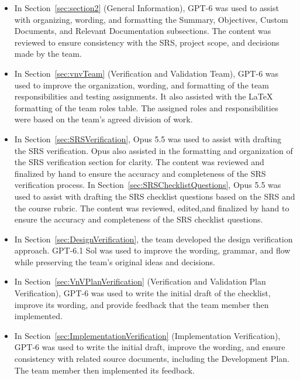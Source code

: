 \documentclass[10pt,titlepage]{article}
\begin{document}
\begin{itemize}
  \item In Section~\ref{sec:section2} (General Information), GPT-6 was used to assist
  with organizing, wording, and formatting the Summary, Objectives,
  Custom Documents, and Relevant Documentation subsections.
  The content was reviewed to ensure consistency with the SRS,
  project scope, and decisions made by the team.

  \item In Section~\ref{sec:vnvTeam} (Verification and Validation Team), GPT-6
  was used to improve the organization, wording, and formatting
  of the team responsibilities and testing assignments. It also
  assisted with the LaTeX formatting of the team roles table.
  The assigned roles and responsibilities were based on the
  team's agreed division of work.

  \item In Section~\ref{sec:SRSVerification}, Opus 5.5 was used to assist with 
  drafting the SRS verification. Opus also assisted in the formatting and 
  organization of the SRS verification section for clarity. The content was reviewed 
  and finalized by hand to ensure the accuracy and completeness of the SRS 
  verification process. In Section~\ref{sec:SRSChecklistQuestions}, Opus 5.5 
  was used to assist with drafting the SRS checklist questions based on the SRS 
  and the course rubric. The content was reviewed, edited,and finalized by hand 
  to ensure the accuracy and completeness of the SRS checklist questions.

  \item In Section~\ref{sec:DesignVerification}, the team developed the design
  verification approach. GPT-6.1 Sol was used to improve the wording, grammar,
  and flow while preserving the team's original ideas and decisions.

  \item In Section~\ref{sec:VnVPlanVerification} (Verification and Validation
  Plan Verification), GPT-6 was used to write the initial draft of the
  checklist, improve its wording, and provide feedback that the team member
  then implemented.

  \item In Section~\ref{sec:ImplementationVerification} (Implementation
  Verification), GPT-6 was used to write the initial draft, improve the
  wording, and ensure consistency with related source documents, including
  the Development Plan. The team member then implemented its feedback.


\end{itemize}
\end{document}
